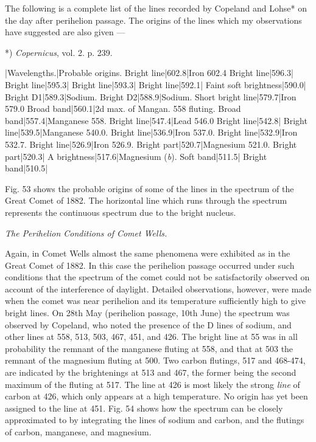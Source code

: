 \documentclass[a4paper, 12pt, oneside, polutonikogreek, english]{article}
\begin{document}
The following is a complete list of the lines recorded by Copeland and Lohse* on the day after perihelion passage. The origins of the lines which my observations have suggested are also given ---

*) \emph{Copernicus}, vol. 2. p. 239.

|Wavelengths.|Probable origins. 
Bright line|602.8|Iron 602.4 
Bright line|596.3| 
Bright line|595.3| 
Bright line|593.3| 
Bright line|592.1| 
Faint soft brightness|590.0| 
Bright D1|589.3|Sodium. 
Bright D2|588.9|Sodium. 
Short bright line|579.7|Iron 579.0 
Broad band|560.1|2d max. of Mangan. 558 fluting. 
Broad band|557.4|Manganese 558. 
Bright line|547.4|Lead 546.0 
Bright line|542.8| 
Bright line|539.5|Manganese 540.0. 
Bright line|536.9|Iron 537.0. 
Bright line|532.9|Iron 532.7. 
Bright line|526.9|Iron 526.9. 
Bright part|520.7|Magnesium 521.0. 
Bright part|520.3| 
A brightness|517.6|Magnesium (\emph{b}). 
Soft band|511.5| 
Bright band|510.5| 

Fig. 53 shows the probable origins of some of the lines in the spectrum of the Great Comet of 1882. The horizontal line which runs through the spectrum represents the continuous spectrum due to the bright nucleus.

\emph{The Perihelion Conditions of Comet Wells.}

Again, in Comet Wells almost the same phenomena were exhibited as in the Great Comet of 1882. In this case the perihelion passage occurred under such conditions that the spectrum of the comet could not be satisfactorily observed on account of the interference of daylight. Detailed observations, however, were made when the comet was near perihelion and its temperature sufficiently high to give bright lines. On 28th May (perihelion passage, 10th June) the spectrum was observed by Copeland, who noted the presence of the D lines of sodium, and other lines at 558, 513, 503, 467, 451, and 426. The bright line at 55 was in all probability the remnant of the manganese fluting at 558, and that at 503 the remnant of the magnesium fluting at 500. Two carbon flutings, 517 and 468-474, are indicated by the brightenings at 513 and 467, the former being the second maximum of the fluting at 517. The line at 426 is most likely the strong \emph{line} of carbon at 426, which only appears at a high temperature. No origin has yet been assigned to the line at 451. Fig. 54 shows how the spectrum can be closely approximated to by integrating the lines of sodium and carbon, and the flutings of carbon, manganese, and magnesium.
\end{document}
